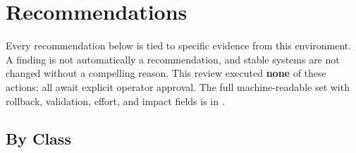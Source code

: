 \section{Recommendations}\label{sec:recommendations}

Every recommendation below is tied to specific evidence from this environment. A finding is not automatically a recommendation, and stable systems are not changed without a compelling reason. This review executed \textbf{none} of these actions; all await explicit operator approval. The full machine-readable set with rollback, validation, effort, and impact fields is in .

\subsection{By Class}

